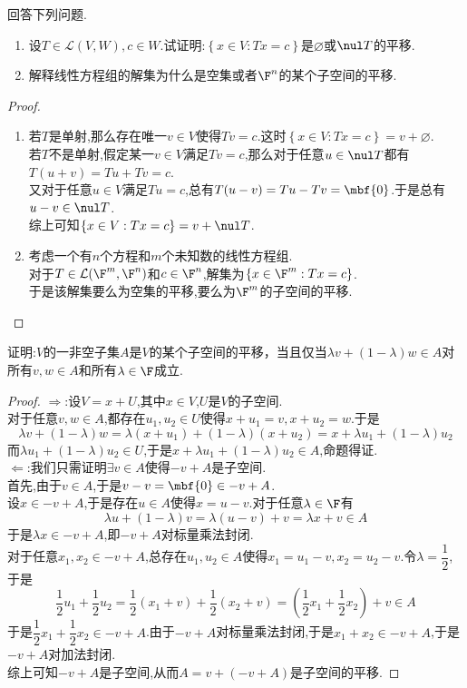 \documentclass{ctexart}
\begin{document}
\begin{problem}[8.]
    回答下列问题.
    \begin{enumerate}[label=\tbf{(\arabic*)}]
        \item 设$T\in\mathcal{L}(V,W),c\in W$.试证明:$\left\{x\in V:Tx=c\right\}$是$\varnothing$或$\nul T$的平移.
        \item 解释线性方程组的解集为什么是空集或者$\F^n$的某个子空间的平移.
    \end{enumerate}
\end{problem}
\begin{proof}
    \begin{enumerate}[label=\tbf{(\arabic*)}]
        \item 若$T$是单射,那么存在唯一$v\in V$使得$Tv=c$.这时$\left\{x\in V:Tx=c\right\}=v+\varnothing$.\\
            若$T$不是单射,假定某一$v\in V$满足$Tv=c$,那么对于任意$u\in\nul T$都有$T(u+v)=Tu+Tv=c$.\\
            又对于任意$u\in V$满足$Tu=c$,总有$T(u-v)=Tu-Tv=\mbf{0}$.于是总有$u-v\in\nul T$.\\
            综上可知$\left\{x\in V:Tx=c\right\}=v+\nul T$.
        \item 考虑一个有$n$个方程和$m$个未知数的线性方程组.\\
            对于$T\in\mathcal{L}(\F^m,\F^n)$和$c\in\F^n$,解集为$\left\{x\in\F^m:Tx=c\right\}$.\\
            于是该解集要么为空集的平移,要么为$\F^m$的子空间的平移.
    \end{enumerate}
\end{proof}
\begin{problem}[9.]
    证明:$V$的一非空子集$A$是$V$的某个子空间的平移，当且仅当$\lambda v+(1-\lambda)w\in A$对所有$v,w\in A$和所有$\lambda\in\F$成立.
\end{problem}
\begin{proof}
    $\Rightarrow$:设$V=x+U$,其中$x\in V$,$U$是$V$的子空间.\\
    对于任意$v,w\in A$,都存在$u_1,u_2\in U$使得$x+u_1=v,x+u_2=w$.于是
    $$\lambda v+(1-\lambda)w=\lambda(x+u_1)+(1-\lambda)(x+u_2)=x+\lambda u_1+(1-\lambda)u_2$$
    而$\lambda u_1+(1-\lambda)u_2\in U$,于是$x+\lambda u_1+(1-\lambda)u_2\in A$,命题得证.\\
    $\Leftarrow$:我们只需证明$\exists v\in A$使得$-v+A$是子空间.\\
    首先,由于$v\in A$,于是$v-v=\mbf{0}\in -v+A$.\\
    设$x\in -v+A$,于是存在$u\in A$使得$x=u-v$.对于任意$\lambda\in\F$有
    $$\lambda u+(1-\lambda)v=\lambda(u-v)+v=\lambda x+v\in A$$
    于是$\lambda x\in -v+A$,即$-v+A$对标量乘法封闭.\\
    对于任意$x_1,x_2\in -v+A$,总存在$u_1,u_2\in A$使得$x_1=u_1-v,x_2=u_2-v$.令$\lambda=\dfrac{1}{2}$,于是
    $$\dfrac{1}{2}u_1+\dfrac{1}{2}u_2=\dfrac{1}{2}(x_1+v)+\dfrac{1}{2}(x_2+v)=\left(\dfrac{1}{2}x_1+\dfrac{1}{2}x_2\right)+v\in A$$
    于是$\dfrac{1}{2}x_1+\dfrac{1}{2}x_2\in -v+A$.由于$-v+A$对标量乘法封闭,于是$x_1+x_2\in -v+A$,于是$-v+A$对加法封闭.\\
    综上可知$-v+A$是子空间,从而$A=v+(-v+A)$是子空间的平移.
\end{proof}
\end{document}
